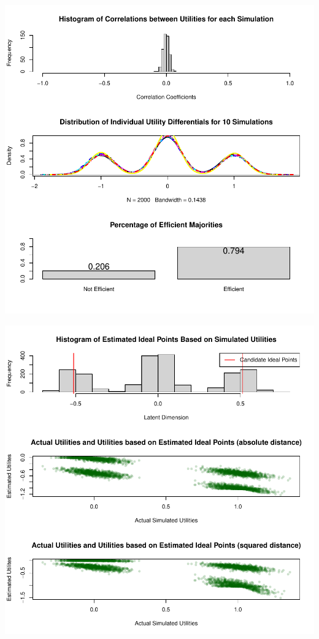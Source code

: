 \documentclass[12pt]{article}\usepackage[]{graphicx}\usepackage[]{color}
\makeatletter
\def\maxwidth{ %
  \ifdim\Gin@nat@width>\linewidth
    \linewidth
  \else
    \Gin@nat@width
  \fi
}
\newenvironment{knitrout}{}{} %
\makeatother
\begin{document}
\begin{knitrout}
\color{fgcolor}
\includegraphics[width=\maxwidth]{figure/unnamed-chunk-171} 

\includegraphics[width=\maxwidth]{figure/unnamed-chunk-172} 

\end{knitrout}


%
%
\end{document}

